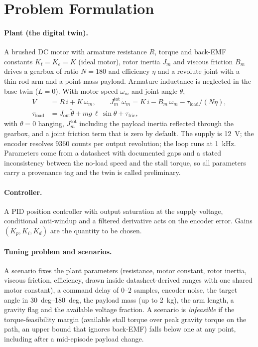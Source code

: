 \section{Problem Formulation}\label{sec:problem}
\paragraph*{Plant (the digital twin).} A brushed DC motor with armature resistance $R$, torque and back-EMF constants $K_t=K_e=K$ (ideal motor), rotor inertia $J_m$ and viscous friction $B_m$ drives a gearbox of ratio $N=180$ and efficiency $\eta$ and a revolute joint with a thin-rod arm and a point-mass payload. Armature inductance is neglected in the base twin ($L=0$). With motor speed $\omega_m$ and joint angle $\theta$,
\begin{align}
V &= R\,i + K\,\omega_m, \qquad J_m^{\mathrm{tot}}\,\dot\omega_m = K\,i - B_m\,\omega_m - \tau_{\mathrm{load}}/(N\eta),\label{eq:plant}\\
\tau_{\mathrm{load}} &= J_{\mathrm{out}}\ddot\theta + m g\,\ell\,\sin\theta + \tau_{\mathrm{fric}},
\end{align}
with $\theta=0$ hanging, $J_m^{\mathrm{tot}}$ including the payload inertia reflected through the gearbox, and a joint friction term that is zero by default. The supply is \SI{12}{V}; the encoder resolves \num{9360} counts per output revolution; the loop runs at \SI{1}{kHz}. Parameters come from a datasheet with documented gaps and a stated inconsistency between the no-load speed and the stall torque, so all parameters carry a provenance tag and the twin is called preliminary.

\paragraph*{Controller.} A PID position controller with output saturation at the supply voltage, conditional anti-windup and a filtered derivative acts on the encoder error. Gains $(K_p,K_i,K_d)$ are the quantity to be chosen.

\paragraph*{Tuning problem and scenarios.} A scenario fixes the plant parameters (resistance, motor constant, rotor inertia, viscous friction, efficiency, drawn inside datasheet-derived ranges with one shared motor constant), a command delay of $0$--$2$ samples, encoder noise, the target angle in \SIrange{30}{180}{deg}, the payload mass (up to \SI{2}{kg}), the arm length, a gravity flag and the available voltage fraction. A scenario is \emph{infeasible} if the torque-feasibility margin (available stall torque over peak gravity torque on the path, an upper bound that ignores back-EMF) falls below one at any point, including after a mid-episode payload change.

